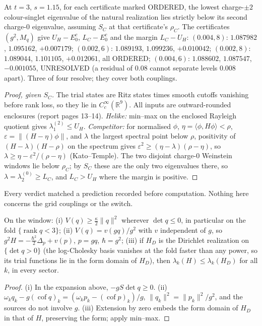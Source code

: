 \begin{theorem}\label{p3thm:order}
 At $t=3$, $s=1.15$, for each certificate marked ORDERED, the lowest charge-$\pm2$
colour-singlet eigenvalue of the natural realization lies strictly below its second charge-$0$ eigenvalue, assuming $S_C$
at that certificate's $\rho_C$. The certificates $(g^2,M_q)$ give $U_H-E_0^c$, $L_C-E_0^c$ and the margin
$L_C-U_H$: $(0.004,8)$: $1.087982$, $1.095162$, $+0.007179$; $(0.002,6)$: $1.089193$, $1.099236$, $+0.010042$;
$(0.002,8)$: $1.089044$, $1.101105$, $+0.012061$, all ORDERED; $(0.004,6)$: $1.088602$, $1.087547$, $-0.001055$,
UNRESOLVED (a residual of $0.08$ cannot separate levels $0.008$ apart). Three of four resolve; they cover both couplings.
\end{theorem}
\begin{proof}[Proof, given $S_C$]
The trial states are Ritz states times smooth cutoffs vanishing before rank loss, so they lie in $C_c^\infty(\mathbb R^9)$.
All inputs are outward-rounded enclosures (report pages 13--14). \emph{Helike:} min--max on the enclosed Rayleigh quotient
gives $\lambda^{(2)}_1\leq U_H$. \emph{Competitor:} for normalised $\phi$, $\eta=\langle\phi,H\phi\rangle<\rho$,
$\varepsilon=\|(H-\eta)\phi\|$, and $\lambda$ the largest spectral point below $\rho$, positivity of $(H-\lambda)(H-\rho)$
on the spectrum gives $\varepsilon^2\geq(\eta-\lambda)(\rho-\eta)$, so $\lambda\geq\eta-\varepsilon^2/(\rho-\eta)$
(Kato--Temple). The two disjoint charge-$0$ Weinstein windows lie below $\rho_C$; by $S_C$ these are the only two
eigenvalues there, so $\lambda=\lambda^{(0)}_2\geq L_C$, and $L_C>U_H$ where the margin is positive.
\end{proof}
Every verdict matched a prediction recorded before computation. Nothing here concerns the grid couplings or the switch.

\begin{lemma}\label{p3lem:fold}
 On the window: (i) $V(q)\geq\tfrac\kappa2\|q\|^2$ wherever $\det q\leq0$, in particular on the fold
$\{\operatorname{rank}q<3\}$; (ii) $V(q)=v(gq)/g^2$ with $v$ independent of $g$, so $g^2H=-\tfrac{\hbar^2}2\Delta_p+v(p)$,
$p=gq$, $\hbar=g^2$; (iii) if $H_D$ is the Dirichlet realization on $\{\det q>0\}$ (the log-Cholesky
basis vanishes at the fold faster than any power, so its trial functions lie in the form domain of $H_D$), then
$\lambda_k(H)\leq\lambda_k(H_D)$ for all $k$, in every sector.
\end{lemma}
\begin{proof}
(i) In the expansion above, $-gS\det q\geq0$. (ii) $\omega_kq_k-g(\operatorname{cof}q)_k=(\omega_kp_k-(\operatorname{cof}p)_k)/g$,
$\|q_k\|^2=\|p_k\|^2/g^2$, and the sources do not involve $g$. (iii) Extension by zero embeds the form domain of $H_D$ in that
of $H$, preserving the form; apply min--max.
\end{proof}

